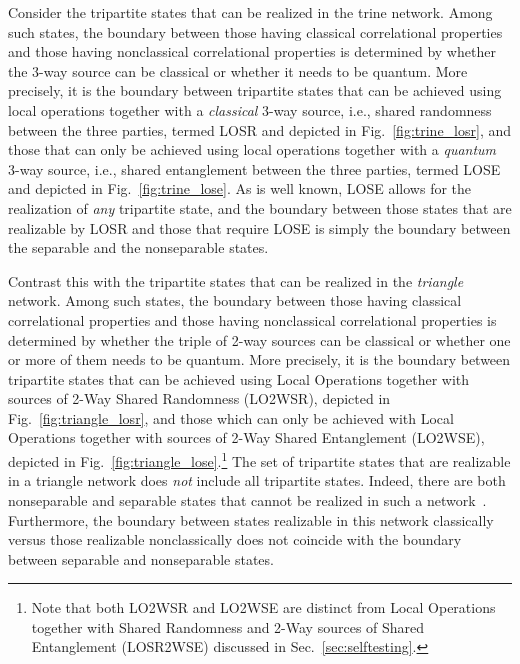 \documentclass[12pt]{article}
\theoremstyle{plain}
\theoremstyle{definition}
\begin{document}
\begin{appendices}
Consider the tripartite states that can be realized in the trine network.    Among such states, the boundary between those having classical correlational properties and those having nonclassical correlational properties is determined by whether the 3-way source can be classical or whether it needs to be quantum.
More precisely, it is the boundary between tripartite states that can be achieved using local operations together with a {\em classical} 3-way source, i.e., shared randomness between the three parties,  termed LOSR and depicted in Fig.~\ref{fig:trine_losr}, and those that can only be achieved using local operations together with a {\em quantum} 3-way source, i.e., shared entanglement between the three parties,  termed LOSE~\cite{Gutoski2008,Schmid2021postquantumcommon} and depicted in Fig.~\ref{fig:trine_lose}.
As is well known, LOSE allows for the realization of {\em any} tripartite state, and the boundary between those states that are realizable by LOSR and those that require LOSE is simply 
 the boundary between the separable and the nonseparable states.
 
Contrast this with the tripartite states that can be realized in the {\em triangle} network.    Among such states, the boundary between those having classical correlational properties and those having nonclassical correlational properties is determined by whether the triple of 2-way sources can be classical or whether one or more of them needs to be quantum.
More precisely, it is the boundary between tripartite states 
that can be achieved using  Local Operations together with sources of 2-Way Shared Randomness (LO2WSR), depicted in Fig.~\ref{fig:triangle_losr}, and those which can only be achieved with Local Operations together with sources of 2-Way Shared Entanglement (LO2WSE), 
depicted in Fig.~\ref{fig:triangle_lose}.\footnote{Note that both LO2WSR and LO2WSE are distinct from 
 Local Operations together with Shared Randomness  and 2-Way sources of Shared Entanglement (LOSR2WSE) discussed in Sec.~\ref{sec:selftesting}.}   
The set of tripartite states that are realizable in a triangle network does {\em not} include all tripartite states.  Indeed, there are both nonseparable and separable states that cannot be realized in such a network~\cite{navascues2020genuine}. 
Furthermore, the boundary between states realizable in this network classically versus those realizable nonclassically does not coincide with the boundary between separable and nonseparable states.


\end{appendices}
\end{document}
